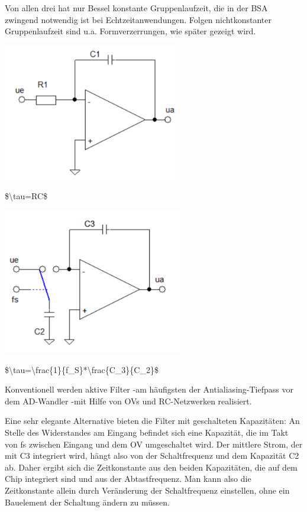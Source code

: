 \documentclass[a4paper]{article}
\begin{document}
\begin{multicols}{3}
\begin{itemize*}
\begin{itemize*}
    \end{itemize*}
    \item Von allen drei hat nur Bessel konstante Gruppenlaufzeit, die in der BSA zwingend notwendig ist bei Echtzeitanwendungen. Folgen nichtkonstanter Gruppenlaufzeit sind u.a. Formverzerrungen, wie später gezeigt wird.
    \item \includegraphics[width=.5\linewidth]{Assets/Biosignalverarbeitung-diskreter-integrator-mit-ov.png}
    \begin{itemize*}
      \item \$\textbackslash tau=RC\$
    \end{itemize*}
    \item \includegraphics[width=.5\linewidth]{Assets/Biosignalverarbeitung-integrierter-integrator-mit-sc.png}
    \begin{itemize*}
      \item \$\textbackslash tau=\textbackslash frac\{1\}\{f\_S\}*\textbackslash frac\{C\_3\}\{C\_2\}\$
    \end{itemize*}
    \item Konventionell werden aktive Filter -am häufigsten der Antialiasing-Tiefpass vor dem AD-Wandler -mit Hilfe von OVs und RC-Netzwerken realisiert.
    \item Eine sehr elegante Alternative bieten die Filter mit geschalteten Kapazitäten: An Stelle des Widerstandes am Eingang befindet sich eine Kapazität, die im Takt von fs zwischen Eingang und dem OV umgeschaltet wird. Der mittlere Strom, der mit C3 integriert wird, hängt also von der Schaltfrequenz und dem Kapazität C2 ab. Daher ergibt sich die Zeitkonstante aus den beiden Kapazitäten, die auf dem Chip integriert sind und aus der Abtastfrequenz. Man kann also die Zeitkonstante allein durch Veränderung der Schaltfrequenz einstellen, ohne ein Bauelement der Schaltung ändern zu müssen.

\end{itemize*}
\end{multicols}
\end{document}
